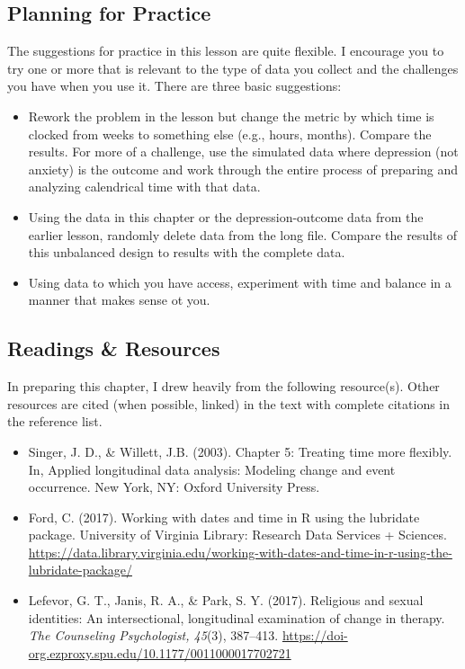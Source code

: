 \documentclass[
  11pt,
]{book}
\providecommand{\tightlist}{%
  \setlength{\itemsep}{0pt}\setlength{\parskip}{0pt}}
\begin{document}
\hypertarget{planning-for-practice-3}{%
\subsection{Planning for Practice}\label{planning-for-practice-3}}

The suggestions for practice in this lesson are quite flexible. I encourage you to try one or more that is relevant to the type of data you collect and the challenges you have when you use it. There are three basic suggestions:

\begin{itemize}
\tightlist
\item
  Rework the problem in the lesson but change the metric by which time is clocked from weeks to something else (e.g., hours, months). Compare the results. For more of a challenge, use the simulated data where depression (not anxiety) is the outcome and work through the entire process of preparing and analyzing calendrical time with that data.
\item
  Using the data in this chapter or the depression-outcome data from the earlier lesson, randomly delete data from the long file. Compare the results of this unbalanced design to results with the complete data.
\item
  Using data to which you have access, experiment with time and balance in a manner that makes sense ot you.
\end{itemize}

\hypertarget{readings-resources-3}{%
\subsection{Readings \& Resources}\label{readings-resources-3}}

In preparing this chapter, I drew heavily from the following resource(s). Other resources are cited (when possible, linked) in the text with complete citations in the reference list.

\begin{itemize}
\tightlist
\item
  Singer, J. D., \& Willett, J.B. (2003). Chapter 5: Treating time more flexibly. In, Applied longitudinal data analysis: Modeling change and event occurrence. New York, NY: Oxford University Press.
\item
  Ford, C. (2017). Working with dates and time in R using the lubridate package. University of Virginia Library: Research Data Services + Sciences. \url{https://data.library.virginia.edu/working-with-dates-and-time-in-r-using-the-lubridate-package/}
\item
  Lefevor, G. T., Janis, R. A., \& Park, S. Y. (2017). Religious and sexual identities: An intersectional, longitudinal examination of change in therapy. \emph{The Counseling Psychologist, 45}(3), 387--413. \url{https://doi-org.ezproxy.spu.edu/10.1177/0011000017702721}
\end{itemize}
\end{document}
